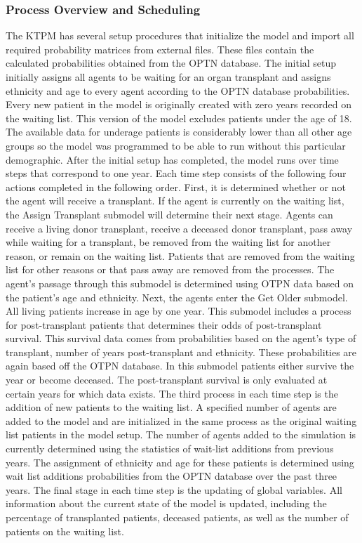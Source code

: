 \documentclass[9pt,a4paper,twocolumn]{scrartcl}
\begin{document}
\subsubsection{Process Overview and Scheduling}
The KTPM has several setup procedures that initialize the model and import all required probability matrices from external files.  These files contain the calculated probabilities obtained from the OPTN database.  The initial setup initially assigns all agents to be waiting for an organ transplant and assigns ethnicity and age to every agent according to the OPTN database probabilities.  Every new patient in the model is originally created with zero years recorded on the waiting list.  This version of the model excludes patients under the age of 18.  The available data for underage patients is considerably lower than all other age groups so the model was programmed to be able to run without this particular demographic.
After the initial setup has completed, the model runs over time steps that correspond to one year.  Each time step consists of the following four actions completed in the following order.
First, it is determined whether or not the agent will receive a transplant.  If the agent is currently on the waiting list, the Assign Transplant submodel will determine their next stage.  Agents can receive a living donor transplant, receive a deceased donor transplant, pass away while waiting for a transplant, be removed from the waiting list for another reason, or remain on the waiting list.  Patients that are removed from the waiting list for other reasons or that pass away are removed from the processes.  The agent’s passage through this submodel is determined using OTPN data based on the patient’s age and ethnicity.  
Next, the agents enter the Get Older submodel.  All living patients increase in age by one year.  This submodel includes a process for post-transplant patients that determines their odds of post-transplant survival.  This survival data comes from probabilities based on the agent’s type of transplant, number of years post-transplant and ethnicity. These probabilities are again based off the OTPN database.  In this submodel patients either survive the year or become deceased.  The post-transplant survival is only evaluated at certain years for which data exists. 
The third process in each time step is the addition of new patients to the waiting list.  A specified number of agents are added to the model and are initialized in the same process as the original waiting list patients in the model setup.  The number of agents added to the simulation is currently determined using the statistics of wait-list additions from previous years.  The assignment of ethnicity and age for these patients is determined using wait list additions probabilities from the OPTN database over the past three years.  
The final stage in each time step is the updating of global variables.  All information about the current state of the model is updated, including the percentage of transplanted patients, deceased patients, as well as the number of patients on the waiting list. 
\end{document}
